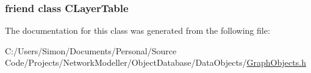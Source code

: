 \subsubsection[{C\+Layer\+Table}]{\setlength{\rightskip}{0pt plus 5cm}friend class {\bf C\+Layer\+Table}\hspace{0.3cm}{\ttfamily [friend]}}\label{class_n_m_1_1_o_d_b_1_1_c_layer_acc9f3446da3623694f17d73565a728db}


The documentation for this class was generated from the following file\+:\begin{DoxyCompactItemize}
\item 
C\+:/\+Users/\+Simon/\+Documents/\+Personal/\+Source Code/\+Projects/\+Network\+Modeller/\+Object\+Database/\+Data\+Objects/\hyperlink{_graph_objects_8h}{Graph\+Objects.\+h}\end{DoxyCompactItemize}
